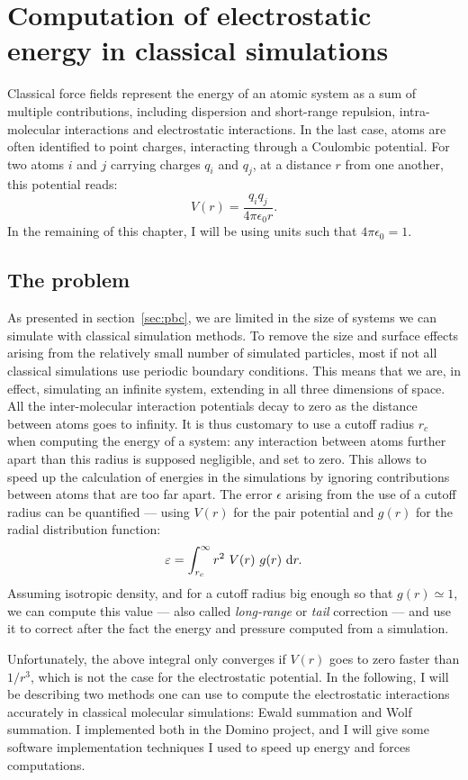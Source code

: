 \documentclass[thesis]{subfiles}
\begin{document}
\newpage
\section{Computation of electrostatic energy in classical simulations}
\label{sec:electrostatic}

Classical force fields represent the energy of an atomic system as a sum of
multiple contributions, including dispersion and short-range repulsion,
intra-molecular interactions and electrostatic interactions. In the last case,
atoms are often identified to point charges, interacting through a Coulombic
potential. For two atoms $i$ and $j$ carrying charges $q_i$ and $q_j$, at a
distance $r$ from one another, this potential reads:
\[ V(r) = \frac{q_i q_j}{4 \pi \epsilon_0 r}.\]
In the remaining of this chapter, I will be using units such that $4 \pi
\epsilon_0 = 1$.

\subsection{The problem}

As presented in section~\ref{sec:pbc}, we are limited in the size of systems we
can simulate with classical simulation methods. To remove the size and surface
effects arising from the relatively small number of simulated particles, most if
not all classical simulations use periodic boundary conditions. This means that
we are, in effect, simulating an infinite system, extending in all three
dimensions of space. All the inter-molecular interaction potentials decay to
zero as the distance between atoms goes to infinity. It is thus customary to use
a cutoff radius $r_c$ when computing the energy of a system: any interaction
between atoms further apart than this radius is supposed negligible, and set to
zero. This allows to speed up the calculation of energies in the simulations by
ignoring contributions between atoms that are too far apart. The error
$\epsilon$ arising from the use of a cutoff radius can be quantified --- using
$V(r)$ for the pair potential and $g(r)$ for the radial distribution function:
\[\epsilon = \int_{r_c}^\infty r^2 \ V(r) \ g(r)\ \d r. \]
Assuming isotropic density, and for a cutoff radius big enough so that $g(r)
\simeq 1$, we can compute this value --- also called \emph{long-range} or
\emph{tail} correction --- and use it to correct after the fact the energy and
pressure computed from a simulation.

Unfortunately, the above integral only converges if $V(r)$ goes to zero faster
than $1/r^3$, which is not the case for the electrostatic potential. In the
following, I will be describing two methods one can use to compute the
electrostatic interactions accurately in classical molecular simulations: Ewald
summation and Wolf summation. I implemented both in the Domino project, and I
will give some software implementation techniques I used to speed up energy and
forces computations.
\end{document}
